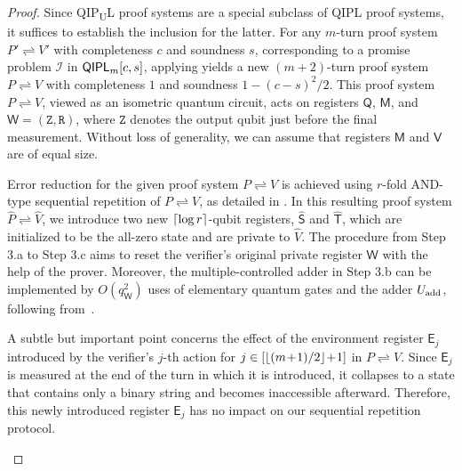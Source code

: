 \documentclass[10pt,a4paper]{article}
\numberwithin{equation}{section}
\numberwithin{figure}{section}
\newcommand{\QIPL}{\textnormal{\textsf{QIPL}}\xspace}
\newcommand{\QIPUL}{\texorpdfstring{\textnormal{\textsf{QIP}\textsubscript{\textnormal{U}}\textsf{L}}}\xspace}
\newcommand{\protocol}[2]{{#1}\!\rightleftharpoons\!{#2}}
\DeclarePairedDelimiter\ceil{\lceil}{\rceil}
\DeclarePairedDelimiter\floor{\lfloor}{\rfloor}
\newcommand{\calI}{\mathcal{I}}
\newcommand{\sfE}{\mathsf{E}}
\newcommand{\sfM}{\mathsf{M}}
\newcommand{\sfQ}{\mathsf{Q}}
\newcommand{\sfS}{\mathsf{S}}
\newcommand{\sfT}{\mathsf{T}}
\newcommand{\sfV}{\mathsf{V}}
\newcommand{\sfW}{\mathsf{W}}
\newcommand{\ttR}{\mathtt{R}}
\newcommand{\ttZ}{\mathtt{Z}}
\newcommand{\hatP}{\widehat{P}}
\newcommand{\hatV}{\widehat{V}}
\begin{document}
\begin{proof}
    Since \QIPUL{} proof systems are a special subclass of \QIPL{} proof systems, it suffices to establish the inclusion for the latter. 
    For any $m$-turn proof system $\protocol{P'}{V'}$ with completeness $c$ and soundness $s$, corresponding to a promise problem $\calI$ in $\QIPL_m[c,s]$, applying  yields a new $(m+2)$-turn proof system $\protocol{P}{V}$ with completeness $1$ and soundness $1-(c-s)^2/2$.
    This proof system $\protocol{P}{V}$, viewed as an isometric quantum circuit, acts on registers $\sfQ$, $\sfM$, and $\sfW = (\ttZ, \ttR)$, where $\ttZ$ denotes the output qubit just before the final measurement. Without loss of generality, we can assume that registers $\sfM$ and $\sfV$ are of equal size. 
        
    Error reduction for the given proof system $\protocol{P}{V}$ is achieved using $r$-fold AND-type sequential repetition of $\protocol{P}{V}$, as detailed in . In this resulting proof system $\protocol{\hatP}{\hatV}$, we introduce two new $\ceil*{\log{r}}$-qubit registers, $\widehat{\sfS}$ and $\widehat{\sfT}$, which are initialized to be the all-zero state and are private to $\hatV$. 
    The procedure from Step 3.a to Step 3.c aims to reset the verifier's original private register $\sfW$ with the help of the prover. Moreover, the multiple-controlled adder in Step 3.b can be implemented by $O(q_{\sfW}^2)$ uses of elementary quantum gates and the adder $U_{\rm add}$, following from~\cite[Lemma 7.5 and Corollary 7.6]{BBC+95}.%

    A subtle but important point concerns the effect of the environment register $\sfE_j$ introduced by the verifier's $j$-th action for $j\in [\floor*{(m\!+\!1)/2}\!+\!1]$ in $\protocol{P}{V}$. Since $\sfE_j$ is measured at the end of the turn in which it is introduced, it collapses to a state that contains only a binary string and becomes inaccessible afterward. Therefore, this newly introduced register $\sfE_j$ has no impact on our sequential repetition protocol.
    
\begin{algorithm}[ht!]
    \SetAlgoVlined
    \setlength{\parskip}{5pt}


\end{algorithm}
\end{proof}
\end{document}
